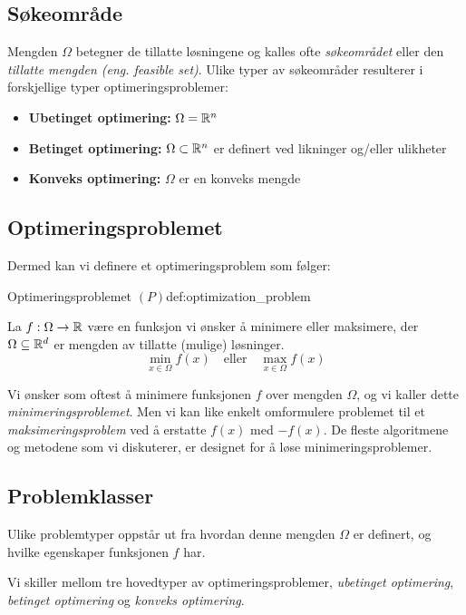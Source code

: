 \subsection{Søkeområde}
Mengden \(\Omega\) betegner de tillatte løsningene og kalles ofte \emph{søkeområdet} eller den \emph{tillatte mengden (eng. feasible set)}.
Ulike typer av søkeområder resulterer i forskjellige typer optimeringsproblemer:
\begin{itemize}
	\item \textbf{Ubetinget optimering:} \(\Omega = \mathbb{R}^n\)
	\item \textbf{Betinget optimering:} \(\Omega \subset \mathbb{R}^n\) er definert ved likninger og/eller ulikheter
	\item \textbf{Konveks optimering:} \(\Omega\) er en konveks mengde
\end{itemize}

\subsection{Optimeringsproblemet}
Dermed kan vi definere et optimeringsproblem som følger:
\begin{definition}{Optimeringsproblemet \((P)\)}{def:optimization_problem}

	La \(f: \Omega \to \mathbb{R}\) være en funksjon vi ønsker å minimere eller maksimere, der \(\Omega \subseteq \mathbb{R}^d\) er mengden av tillatte (mulige) løsninger.
	\[
		\min_{x \in \Omega} f(x) \quad \text{eller} \quad \max_{x \in \Omega} f(x) \tag{P}
	\]
\end{definition}

Vi ønsker som oftest å minimere funksjonen \(f\) over mengden \(\Omega\), og vi kaller dette \emph{minimeringsproblemet}.
Men vi kan like enkelt omformulere problemet til et \emph{maksimeringsproblem} ved å erstatte \(f(x)\) med \(-f(x)\).
De fleste algoritmene og metodene som vi diskuterer, er designet for å løse minimeringsproblemer.

\subsection{Problemklasser}
\label{sec:problem_classes}
Ulike problemtyper oppstår ut fra hvordan denne mengden \(\Omega\) er definert, og hvilke egenskaper funksjonen \(f\) har.

Vi skiller mellom tre hovedtyper av optimeringsproblemer, \emph{ubetinget optimering}, \emph{betinget optimering} og \emph{konveks optimering}.

